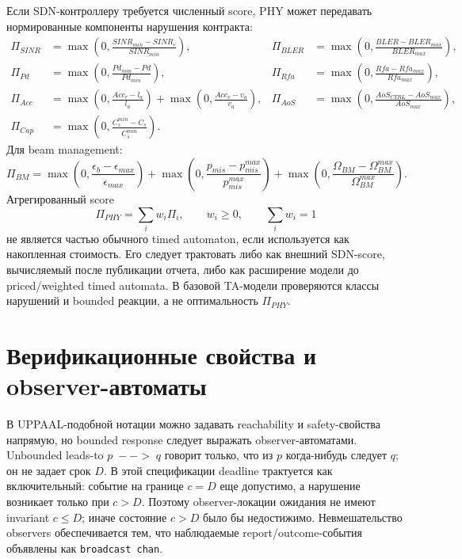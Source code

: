 \documentclass[10pt,a4paper]{article}
\newcommand{\code}[1]{\texttt{#1}}
\begin{document}
Если SDN-контроллеру требуется численный score, PHY может передавать нормированные компоненты нарушения контракта:
\begin{align}
\Pi_{SINR}&=\max\left(0,\frac{SINR_{min}-SINR_c}{SINR_{min}}\right),&
\Pi_{BLER}&=\max\left(0,\frac{BLER-BLER_{max}}{BLER_{max}}\right),\\
\Pi_{Pd}&=\max\left(0,\frac{Pd_{min}-Pd}{Pd_{min}}\right),&
\Pi_{Rfa}&=\max\left(0,\frac{Rfa-Rfa_{max}}{Rfa_{max}}\right),\\
\Pi_{Acc}&=\max\left(0,\frac{Acc_r-l_a}{l_a}\right)+\max\left(0,\frac{Acc_v-v_a}{v_a}\right),&
\Pi_{AoS}&=\max\left(0,\frac{AoS_{CTRL}-AoS_{max}}{AoS_{max}}\right),\\
\Pi_{Cap}&=\max\left(0,\frac{C_s^{min}-C_s}{C_s^{min}}\right).&&
\end{align}
Для beam management:
\begin{equation}
\Pi_{BM}=\max\left(0,\frac{\epsilon_b-\epsilon_{max}}{\epsilon_{max}}\right)+\max\left(0,\frac{p_{mis}-p_{mis}^{max}}{p_{mis}^{max}}\right)+\max\left(0,\frac{\Omega_{BM}-\Omega_{BM}^{max}}{\Omega_{BM}^{max}}\right).
\end{equation}
Агрегированный score
\begin{equation}
\Pi_{PHY}=\sum_i w_i\Pi_i,
\qquad w_i\ge 0,
\qquad \sum_iw_i=1
\end{equation}
не является частью обычного timed automaton, если используется как накопленная стоимость. Его следует трактовать либо как внешний SDN-score, вычисляемый после публикации отчета, либо как расширение модели до priced/weighted timed automata. В базовой TA-модели проверяются классы нарушений и bounded реакции, а не оптимальность \(\Pi_{PHY}\).

\section{Верификационные свойства и observer-автоматы}

В UPPAAL-подобной нотации можно задавать reachability и safety-свойства напрямую, но bounded response следует выражать observer-автоматами. Unbounded leads-to \(p\;--\!>\;q\) говорит только, что из \(p\) когда-нибудь следует \(q\); он не задает срок \(D\). В этой спецификации deadline трактуется как включительный: событие на границе \(c=D\) еще допустимо, а нарушение возникает только при \(c>D\). Поэтому observer-локации ожидания не имеют invariant \(c\le D\); иначе состояние \(c>D\) было бы недостижимо. Невмешательство observers обеспечивается тем, что наблюдаемые report/outcome-события объявлены как \code{broadcast chan}.
\end{document}
